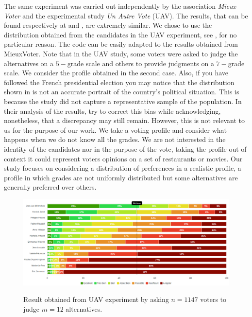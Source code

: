 	The same experiment was carried out independently by the association \textit{Mieux Voter} and the experimental study \textit{Un Autre Vote} (UAV). The results, that can be found respectively at \citet{MieuxVoterElection2022} and \citet{UAVElection2022}, are extremely similar.  We chose to use the distribution obtained from the candidates in the UAV experiment, see , for no particular reason. The code can be easily adapted to the results obtained from MieuxVoter.
	Note that in the UAV study, some voters were asked to judge the alternatives on a $5-$grade scale and others to provide judgments on a $7-$grade scale. We consider the profile obtained in the second case.
	Also, if you have followed the French presidential election you may notice that the distribution shown in  is not an accurate portrait of the country's political situation. This is because the study did not capture a representative sample of the population. In their analysis of the results, \citet{UAVElection2022} try to correct this bias while acknowledging, nonetheless, that a discrepancy may still remain.
	However, this is not relevant to us for the purpose of our work. We take a voting profile and consider what happens when we do not know all the grades. We are not interested in the identity of the candidates nor in the purpose of the vote, taking the profile out of context it could represent voters opinions on a set of restaurants or movies. Our study focuses on considering a distribution of preferences in a realistic profile, a profile in which grades are not uniformly distributed but some alternatives are generally preferred over others.
	
	\begin{figure}
		\caption{Result obtained from UAV experiment by asking $n=1147$ voters to judge $m=12$ alternatives.}
		\includegraphics[scale=0.35]{data/profileUAV}
		\label{fig:distributionUAV}
	\end{figure}
	

